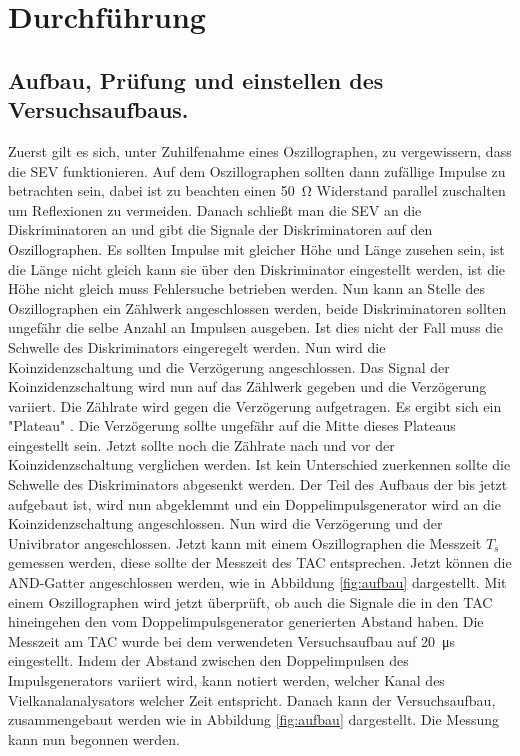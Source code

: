 \section{Durchführung}
\label{sec:Durchführung}
\subsection{Aufbau, Prüfung und einstellen des Versuchsaufbaus.}
Zuerst gilt es sich, unter Zuhilfenahme eines Oszillographen, zu vergewissern, 
dass die SEV funktionieren. 
Auf dem Oszillographen sollten dann zufällige Impulse zu betrachten sein, dabei ist zu beachten 
einen \SI{50}{\ohm} Widerstand parallel zuschalten um Reflexionen zu vermeiden. 
Danach schließt man die SEV an die Diskriminatoren an und gibt die Signale der Diskriminatoren
auf den Oszillographen. Es sollten Impulse mit gleicher Höhe und Länge zusehen sein, ist die Länge 
nicht gleich kann sie über den Diskriminator eingestellt werden, ist die Höhe nicht gleich muss 
Fehlersuche betrieben werden. 
Nun kann an Stelle des Oszillographen 
ein Zählwerk angeschlossen werden, beide Diskriminatoren sollten ungefähr die selbe Anzahl an 
Impulsen ausgeben. Ist dies nicht der Fall muss die Schwelle des Diskriminators eingeregelt werden. 
Nun wird die Koinzidenzschaltung und die Verzögerung angeschlossen. Das Signal der 
Koinzidenzschaltung wird nun auf das Zählwerk gegeben und die Verzögerung variiert. Die Zählrate 
wird gegen die Verzögerung aufgetragen. Es ergibt sich ein "Plateau" . 
Die Verzögerung sollte ungefähr 
auf die Mitte dieses Plateaus eingestellt sein. Jetzt sollte noch die Zählrate nach und vor 
der Koinzidenzschaltung verglichen werden. Ist kein Unterschied zuerkennen sollte die Schwelle des 
Diskriminators abgesenkt werden. 
\newline
Der Teil des Aufbaus der bis jetzt aufgebaut ist, wird nun abgeklemmt und ein Doppelimpulsgenerator 
wird an die Koinzidenzschaltung angeschlossen. Nun wird die Verzögerung und der Univibrator 
angeschlossen. Jetzt kann mit einem Oszillographen die Messzeit $T_s$ gemessen werden, diese sollte 
der Messzeit des TAC entsprechen. Jetzt können die AND-Gatter angeschlossen 
werden, wie in Abbildung \ref{fig:aufbau} dargestellt. Mit einem Oszillographen wird jetzt 
überprüft, ob auch die Signale die in den TAC hineingehen den vom Doppelimpulsgenerator generierten 
Abstand haben. Die Messzeit am TAC wurde bei dem verwendeten Versuchsaufbau auf \SI{20}{\micro\second} 
eingestellt.
\newline 
Indem der Abstand zwischen den Doppelimpulsen des Impulsgenerators variiert wird, kann notiert 
werden, welcher Kanal des Vielkanalanalysators welcher Zeit entspricht. 
Danach kann der Versuchsaufbau, 
zusammengebaut werden wie in Abbildung \ref{fig:aufbau} dargestellt. Die Messung kann nun 
begonnen werden.   
